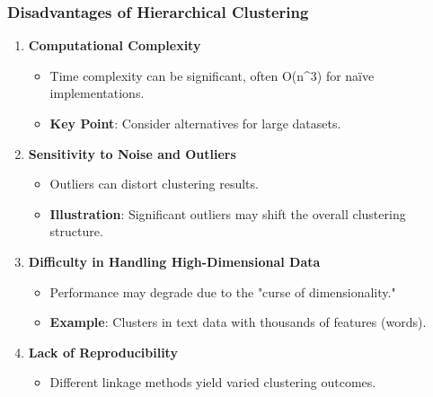 \documentclass[aspectratio=169]{beamer}
\begin{document}
\begin{frame}[fragile]
    \frametitle{Disadvantages of Hierarchical Clustering}
    \begin{enumerate}
        \item \textbf{Computational Complexity}
        \begin{itemize}
            \item Time complexity can be significant, often O(n^3) for naïve implementations.
            \item \textbf{Key Point}: Consider alternatives for large datasets.
        \end{itemize}

        \item \textbf{Sensitivity to Noise and Outliers}
        \begin{itemize}
            \item Outliers can distort clustering results.
            \item \textbf{Illustration}: Significant outliers may shift the overall clustering structure.
        \end{itemize}

        \item \textbf{Difficulty in Handling High-Dimensional Data}
        \begin{itemize}
            \item Performance may degrade due to the "curse of dimensionality."
            \item \textbf{Example}: Clusters in text data with thousands of features (words).
        \end{itemize}

        \item \textbf{Lack of Reproducibility}
        \begin{itemize}
            \item Different linkage methods yield varied clustering outcomes.
        \end{itemize}
    \end{enumerate}
\end{frame}
\end{document}
